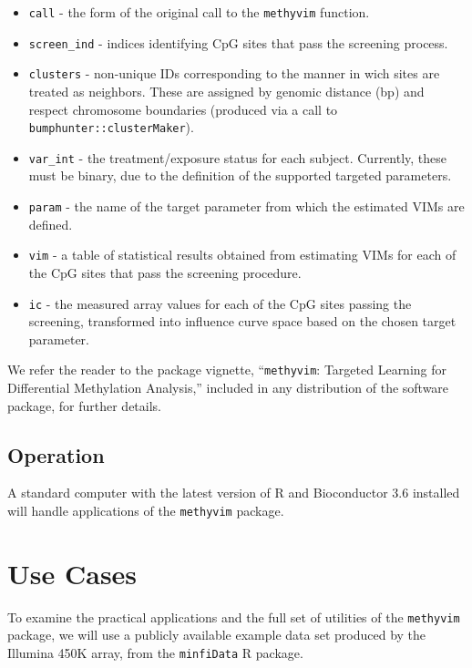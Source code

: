 \documentclass[9pt,a4paper,]{extarticle}
\theoremstyle{definition}
\theoremstyle{definition}
\theoremstyle{definition}
\theoremstyle{remark}
\begin{document}
\begin{itemize}
\item
  \texttt{call} - the form of the original call to the \texttt{methyvim}
  function.
\item
  \texttt{screen\_ind} - indices identifying CpG sites that pass the
  screening process.
\item
  \texttt{clusters} - non-unique IDs corresponding to the manner in wich
  sites are treated as neighbors. These are assigned by genomic distance
  (bp) and respect chromosome boundaries (produced via a call to
  \texttt{bumphunter::clusterMaker}).
\item
  \texttt{var\_int} - the treatment/exposure status for each subject.
  Currently, these must be binary, due to the definition of the
  supported targeted parameters.
\item
  \texttt{param} - the name of the target parameter from which the
  estimated VIMs are defined.
\item
  \texttt{vim} - a table of statistical results obtained from estimating
  VIMs for each of the CpG sites that pass the screening procedure.
\item
  \texttt{ic} - the measured array values for each of the CpG sites
  passing the screening, transformed into influence curve space based on
  the chosen target parameter.
\end{itemize}

We refer the reader to the package vignette, ``\texttt{methyvim}:
Targeted Learning for Differential Methylation Analysis,'' included in
any distribution of the software package, for further details.

\subsection{Operation}\label{operation}

A standard computer with the latest version of R and Bioconductor 3.6
installed will handle applications of the \texttt{methyvim} package.

\section{Use Cases}\label{use-cases}

To examine the practical applications and the full set of utilities of
the \texttt{methyvim} package, we will use a publicly available example
data set produced by the Illumina 450K array, from the
\texttt{minfiData} R package.
\end{document}
